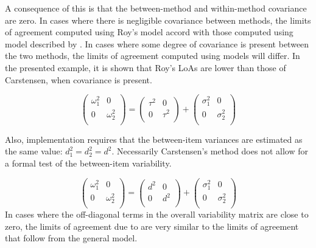 \documentclass[12pt, a4paper]{report}
\theoremstyle{plain}
\theoremstyle{definition}
\theoremstyle{remark}
\begin{document}
A consequence of this is that the between-method and within-method covariance are zero. In cases where there is negligible covariance between methods, the limits of agreement computed using Roy's model accord with those computed using model described by \citet{BXC2008}. In cases where some degree of covariance is present between the two methods, the limits of agreement computed using models will differ. In the presented example, it is shown that Roy's LoAs are lower than those of Carstensen, when covariance is present.

\[\left(\begin{array}{cc}
\omega^2_1  & 0 \\
0 & \omega^2_2 \\
\end{array}  \right)
=  \left(
\begin{array}{cc}
\tau^2  & 0 \\
0 & \tau^2 \\
\end{array} \right)+
\left(
\begin{array}{cc}
\sigma^2_1  & 0 \\
0 & \sigma^2_2 \\
\end{array}\right)
\]





Also, implementation requires that the between-item variances are estimated as the same value: $d^2_1 = d^2_2 = d^2$. Necessarily
Carstensen's method does not allow for a formal test of the between-item variability.

\[\left(\begin{array}{cc}
\omega^2_1  & 0 \\
0 & \omega^2_2 \\
\end{array}  \right)
=  \left(
\begin{array}{cc}
d^2  & 0 \\
0 & d^2 \\
\end{array} \right)+
\left(
\begin{array}{cc}
\sigma^2_1  & 0 \\
0 & \sigma^2_2 \\
\end{array}\right)
\]
In cases where the off-diagonal terms in the overall variability
matrix are close to zero, the limits of agreement due to \citet{BXC2008} are very similar to the limits of agreement that follow from the general model.
\end{document}
